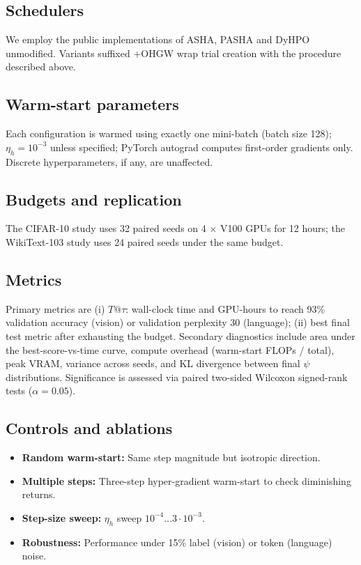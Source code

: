 \documentclass{article} %
\begin{document}
\subsection{Schedulers}
We employ the public implementations of ASHA, PASHA and DyHPO~\cite{bohdal-2022-pasha,wistuba-2022-supervising} unmodified. Variants suffixed \(+\)OHGW wrap trial creation with the procedure described above.

\subsection{Warm-start parameters}
Each configuration is warmed using exactly one mini-batch (batch size 128); \(\eta_h = 10^{-3}\) unless specified; PyTorch autograd computes first-order gradients only. Discrete hyperparameters, if any, are unaffected.

\subsection{Budgets and replication}
The CIFAR-10 study uses 32 paired seeds on 4 \(\times\) V100 GPUs for 12 hours; the WikiText-103 study uses 24 paired seeds under the same budget.

\subsection{Metrics}
Primary metrics are (i) \(T@\tau\): wall-clock time and GPU-hours to reach 93\% validation accuracy (vision) or validation perplexity 30 (language); (ii) best final test metric after exhausting the budget. Secondary diagnostics include area under the best-score-vs-time curve, compute overhead (warm-start FLOPs / total), peak VRAM, variance across seeds, and KL divergence between final \(\psi\) distributions. Significance is assessed via paired two-sided Wilcoxon signed-rank tests (\(\alpha = 0.05\)).

\subsection{Controls and ablations}
\begin{itemize}
  \item \textbf{Random warm-start:} Same step magnitude but isotropic direction.
  \item \textbf{Multiple steps:} Three-step hyper-gradient warm-start to check diminishing returns.
  \item \textbf{Step-size sweep:} \(\eta_h\) sweep \(10^{-4} \ldots 3\cdot10^{-3}\).
  \item \textbf{Robustness:} Performance under 15\% label (vision) or token (language) noise.
\end{itemize}
\end{document}
